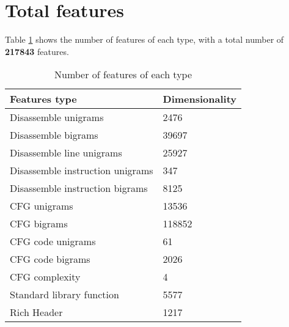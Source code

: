 \section{Total features}
Table \ref{tab:num_feat} shows the number of features of each type, with a total number of \textbf{217843} features.

\begin{table}[!htb]
		\centering
		\caption{Number of features of each type}
		\label{tab:num_feat}
			\begin{tabular}{ll}
				\toprule
				Features type                    & Dimensionality \\
				\midrule
				Disassemble unigrams             & 2476           \\ 
				Disassemble bigrams              & 39697          \\ 
				Disassemble line unigrams        & 25927          \\ 
				Disassemble instruction unigrams & 347            \\ 
				Disassemble instruction bigrams  & 8125           \\ 
				CFG unigrams                     & 13536          \\ 
				CFG bigrams                      & 118852         \\ 
				CFG code unigrams                & 61             \\ 
				CFG code bigrams                 & 2026           \\ 
				CFG complexity                   & 4              \\ 
				Standard library function        & 5577           \\ 
				Rich Header & 1217           \\ 
				\bottomrule
			\end{tabular}
		
\end{table}


